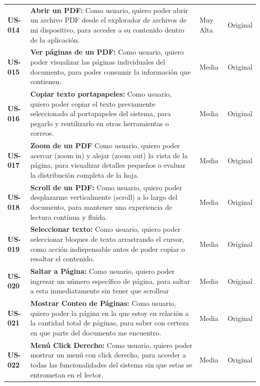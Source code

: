 \begin{longtable}{|l||p{7cm}|l|l|}
\textbf{US-014} & 
\textbf{Abrir un PDF:} Como usuario, quiero poder abrir un archivo PDF desde el explorador de archivos de mi dispositivo, para acceder a su contenido dentro de la aplicación. & Muy Alta & Original\\

\textbf{US-015} & 
\textbf{Ver páginas de un PDF:} Como usuario, quiero poder visualizar las páginas individuales del documento, para poder consumir la información que contienen. & Media & Original\\

\textbf{US-016} & 
\textbf{Copiar texto portapapeles:} Como usuario, quiero poder copiar el texto previamente seleccionado al portapapeles del sistema, para pegarlo y reutilizarlo en otras herramientas o correos. & Media & Original\\

\textbf{US-017} & 
\textbf{Zoom de un PDF} Como usuario, quiero poder acercar (zoom in) y alejar (zoom out) la vista de la página, para visualizar detalles pequeños o evaluar la distribución completa de la hoja. & Media & Original\\

\textbf{US-018} & 
\textbf{Scroll de un PDF:} Como usuario, quiero poder desplazarme verticalmente (scroll) a lo largo del documento, para mantener una experiencia de lectura continua y fluida. & Media & Original\\

\textbf{US-019} & 
\textbf{Seleccionar texto:} Como usuario, quiero poder seleccionar bloques de texto arrastrando el cursor, como acción indispensable antes de poder copiar o resaltar el contenido. & Media & Original\\

\textbf{US-020} & 
\textbf{Saltar a Página:} Como usuario, quiero poder ingresar un número específico de página, para saltar a esta inmediatamente sin tener que scrollear & Media & Original\\

\textbf{US-021} & 
\textbf{Mostrar Conteo de Páginas:} Como usuario, quiero poder la página en la que estoy en relación a la cantidad total de páginas, para saber con certeza en que parte del documento me encuentro. & Media & Original\\

\textbf{US-022} & 
\textbf{Menú Click Derecho:} Como usuario, quiero poder mostrar un menú con click derecho, para acceder a todas las funcionalidades del sistema sin que estas se entrometan en el lector. & Media & Original\\
\hline


\end{longtable}
